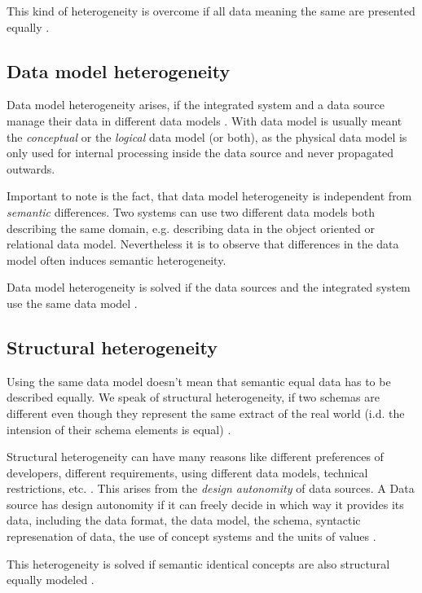 This kind of heterogeneity is overcome if all data meaning the same are presented equally \cite[p. 61]{DBLP:books/dp/LeserN2006}.

\subsection{Data model  heterogeneity}
Data model heterogeneity arises, if the integrated system and a data source manage their data in different data models \cite[p. 65]{DBLP:books/dp/LeserN2006}. With data model is usually meant the \emph{conceptual} or the \emph{logical} data model (or both), as the physical data model is only used for internal processing inside the data source and never propagated outwards.

Important to note is the fact, that data model heterogeneity is independent from \emph{semantic} differences. Two systems can use two different data models both describing the same domain, e.g. describing data in the object oriented or relational data model. Nevertheless it is to observe that differences in the data model often induces semantic heterogeneity.

Data model heterogeneity is solved if the data sources and the integrated system use the same data model \cite[p. 61]{DBLP:books/dp/LeserN2006}.

\subsection{Structural  heterogeneity}
Using the same data model doesn't mean that semantic equal data has to be described equally. We speak of structural heterogeneity, if two schemas are different even though they represent the same extract of the real world (i.d. the intension of their schema elements is equal) \cite[p. 67]{DBLP:books/dp/LeserN2006}. 

Structural heterogeneity can have many reasons like different preferences of developers, different requirements, using different data models, technical restrictions, etc. . This arises from the \textit{design autonomity} of data sources. A Data source has design autonomity if it can freely decide in which way it provides its data, including the data format, the data model, the schema, syntactic represenation of data, the use of concept systems and the units of values \cite[p.55]{DBLP:books/dp/LeserN2006}.

This heterogeneity is solved if semantic identical concepts are also structural equally modeled  \cite[p. 61]{DBLP:books/dp/LeserN2006}.

